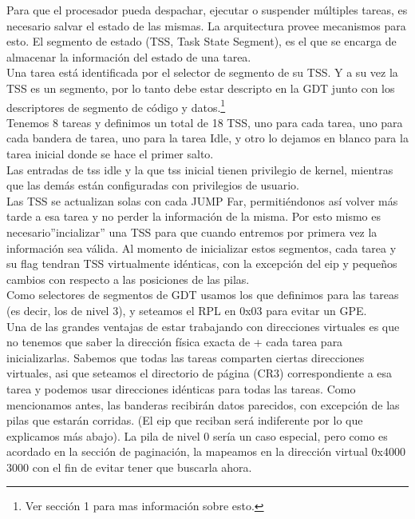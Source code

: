 Para que el procesador pueda despachar, ejecutar o suspender m\'ultiples tareas, es necesario salvar el estado de las mismas. La 
arquitectura provee mecanismos para esto. El segmento de estado (TSS, Task State Segment), es el que se encarga de almacenar la 
informaci\'on del estado de una tarea.\\

Una tarea est\'a identificada por el selector de segmento de su TSS. Y a su vez la TSS es un segmento, por lo tanto debe estar descripto 
en la GDT junto con los descriptores de segmento de c\'odigo y datos.\footnote{Ver secci\'on 1 para mas informaci\'on sobre esto.}\\

Tenemos 8 tareas y definimos un total de 18 TSS, uno para cada tarea, uno para cada bandera de tarea, uno para la tarea Idle, y otro lo 
dejamos en blanco para la tarea inicial donde se hace el primer salto.\\
Las entradas de tss idle y la que tss inicial tienen privilegio de kernel, mientras que las dem\'as est\'an configuradas con privilegios 
de usuario.\\

Las TSS se actualizan solas con cada JUMP Far, permiti\'endonos as\'i volver m\'as tarde a esa tarea y no perder la informaci\'on de la 
misma. Por esto mismo es necesario''incializar'' una TSS para que cuando entremos por primera vez la informaci\'on
sea v\'alida. Al momento de inicializar estos segmentos, cada tarea y su flag tendran TSS virtualmente id\'enticas, con la excepci\'on del
 eip y pequeños cambios con respecto a las posiciones de las pilas.\\

Como selectores de segmentos de GDT usamos los que definimos para las tareas (es decir, los de nivel 3), y seteamos el RPL en 0x03 para 
evitar un GPE.\\

Una de las grandes ventajas de estar trabajando con direcciones virtuales es que no tenemos que saber la direcci\'on f\'isica exacta de +
cada tarea para inicializarlas. Sabemos que todas las tareas comparten ciertas direcciones virtuales, asi que seteamos el directorio de 
p\'agina (CR3) correspondiente a esa tarea y podemos usar direcciones id\'enticas para todas las tareas. Como mencionamos antes, las 
banderas recibir\'an datos parecidos, con excepci\'on de las pilas que estar\'an corridas. (El eip que reciban ser\'a indiferente por lo 
que explicamos m\'as abajo).
La pila de nivel 0 ser\'ia un caso especial, pero como es acordado en la secci\'on de paginaci\'on, la mapeamos en la direcci\'on virtual
 0x4000 3000 con el fin de evitar tener que buscarla ahora.

